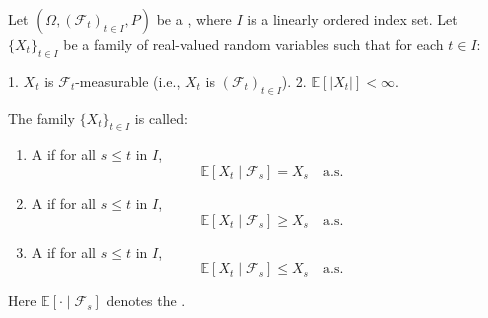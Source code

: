 \begin{definition} \label{definition:martingale_submartingale_supermartingale_with_respect_to_a_filtration}
Let $(\Omega, (\mathcal{F}_t)_{t \in I}, P)$ be a , where $I$ is a linearly ordered index set. Let $\{X_t\}_{t \in I}$ be a family of real-valued random variables such that for each $t \in I$:

1. $X_t$ is $\mathcal{F}_t$-measurable (i.e., $X_t$ is  $(\mathcal{F}_t)_{t \in I}$).
2. $\mathbb{E}[|X_t|] < \infty$.

The family $\{X_t\}_{t \in I}$ is called:

\begin{enumerate}
    \item A  if for all $s \leq t$ in $I$,
    $$\mathbb{E}[X_t \mid \mathcal{F}_s] = X_s \quad \text{a.s.}$$

    \item A  if for all $s \leq t$ in $I$,
    $$\mathbb{E}[X_t \mid \mathcal{F}_s] \geq X_s \quad \text{a.s.}$$

    \item A  if for all $s \leq t$ in $I$,
    $$\mathbb{E}[X_t \mid \mathcal{F}_s] \leq X_s \quad \text{a.s.}$$
\end{enumerate}

Here $\mathbb{E}[\cdot \mid \mathcal{F}_s]$ denotes the .
\end{definition}